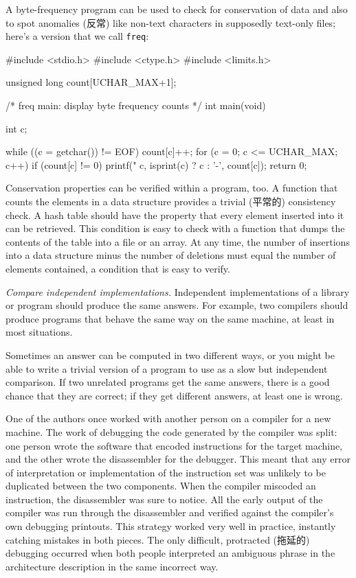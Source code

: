 A byte-frequency program can be used to check for conservation of data and
also to spot anomalies (反常) like non-text characters in supposedly
text-only files; here's a version that we call \texttt{freq}:
\begin{wellcode}
    #include <stdio.h>
    #include <ctype.h>
    #include <limits.h>

    unsigned long count[UCHAR_MAX+1];

    /* freq main: display byte frequency counts */
    int main(void)
    {
        int c;

        while ((c = getchar()) != EOF)
            count[c]++;
        for (c = 0; c <= UCHAR_MAX; c++)
            if (count[c] != 0)
                printf("%
                        c, isprint(c) ? c : '-', count[c]);
        return 0;
    }
\end{wellcode}

Conservation properties can be verified within a program, too. A function
that counts the elements in a data structure provides a trivial (平常的)
consistency check. A hash table should have the property that every element
inserted into it can be retrieved.  This condition is easy to check with a
function that dumps the contents of the table into a file or an array. At
any time, the number of insertions into a data structure minus the number
of deletions must equal the number of elements contained, a condition that
is easy to verify.

\emph{Compare independent implementations.} Independent implementations of
a library or program should produce the same answers. For example, two
compilers should produce programs that behave the same way on the same
machine, at least in most situations.

Sometimes an answer can be computed in two different ways, or you might be
able to write a trivial version of a program to use as a slow but
independent comparison. If two unrelated programs get the same answers,
there is a good chance that they are correct; if they get different
answers, at least one is wrong.

One of the authors once worked with another person on a compiler for a new
machine. The work of debugging the code generated by the compiler was
split: one person wrote the software that encoded instructions for the
target machine, and the other wrote the disassembler for the debugger. This
meant that any error of interpretation or implementation of the instruction
set was unlikely to be duplicated between the two components. When the
compiler miscoded an instruction, the disassembler was sure to notice. All
the early output of the compiler was run through the disassembler and
verified against the compiler's own debugging printouts. This strategy
worked very well in practice, instantly catching mistakes in both pieces.
The only difficult, protracted (拖延的) debugging occurred when both people
interpreted an ambiguous phrase in the architecture description in the same
incorrect way.

